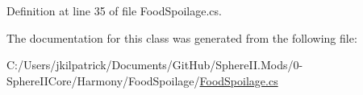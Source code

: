 Definition at line 35 of file Food\+Spoilage.\+cs.



The documentation for this class was generated from the following file\+:\begin{DoxyCompactItemize}
\item 
C\+:/\+Users/jkilpatrick/\+Documents/\+Git\+Hub/\+Sphere\+I\+I.\+Mods/0-\/\+Sphere\+I\+I\+Core/\+Harmony/\+Food\+Spoilage/\mbox{\hyperlink{_food_spoilage_8cs}{Food\+Spoilage.\+cs}}\end{DoxyCompactItemize}
